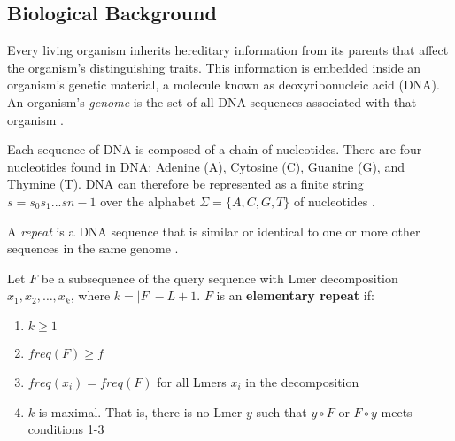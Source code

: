 \subsection{Biological Background}
Every living organism inherits hereditary information from its parents that affect the organism's distinguishing traits. This information is embedded inside an organism's genetic material, a molecule known as deoxyribonucleic acid (DNA). An organism's \textit{genome} is the set of all DNA sequences associated with that organism \cite{lewin:2014:lewins}.

Each sequence of DNA is composed of a chain of nucleotides. There are four nucleotides found in DNA: Adenine (A), Cytosine (C), Guanine (G), and Thymine (T). DNA can therefore be represented as a finite string $s=s_{0}s_{1}...s{n-1}$ over the alphabet $\Sigma=\lbrace A, C, G, T\rbrace$ of nucleotides \cite{elloumi:2011:algorithms}.

A \textit{repeat} is a DNA sequence that is similar or identical to one or more other sequences in the same genome \cite{treangen:2012:repetitive}. 

\begin{defn}
Let $F$ be a subsequence of the query sequence with Lmer decomposition $x_{1},x_{2},\dotsc ,x_{k}$, where $k=\lvert F \rvert - L + 1$. $F$ is an \textbf{elementary repeat} if:
\begin{enumerate}
\item $k \geq 1$
\item $freq(F) \geq f$
\item $freq(x_{i})=freq(F)$ for all Lmers $x_{i}$ in the decomposition
\item $k$ is maximal. That is, there is no Lmer $y$ such that $y\circ F$ or $F\circ y$ meets conditions 1-3
\end{enumerate} \cite{figueroa:2013:raider:}
\end{defn}



